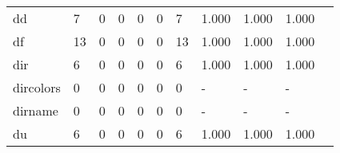 \begin{longtable}{lp{1.20cm}p{1.20cm}p{1.20cm}p{1.20cm}p{1.20cm}p{1.20cm}p{1.20cm}p{1.20cm}p{1.20cm}p{1.20cm}}
dd        &                                     7 &                                                  0 &                                                  0 &                                                  0 &                                                  0 &                                                  7 &                                         1.000 &                                              1.000 &                                              1.000 \\
df        &                                    13 &                                                  0 &                                                  0 &                                                  0 &                                                  0 &                                                 13 &                                         1.000 &                                              1.000 &                                              1.000 \\
dir       &                                     6 &                                                  0 &                                                  0 &                                                  0 &                                                  0 &                                                  6 &                                         1.000 &                                              1.000 &                                              1.000 \\
dircolors &                                     0 &                                                  0 &                                                  0 &                                                  0 &                                                  0 &                                                  0 &                                             - &                                                  - &                                                  - \\
dirname   &                                     0 &                                                  0 &                                                  0 &                                                  0 &                                                  0 &                                                  0 &                                             - &                                                  - &                                                  - \\
du        &                                     6 &                                                  0 &                                                  0 &                                                  0 &                                                  0 &                                                  6 &                                         1.000 &                                              1.000 &                                              1.000 \\

\end{longtable}
